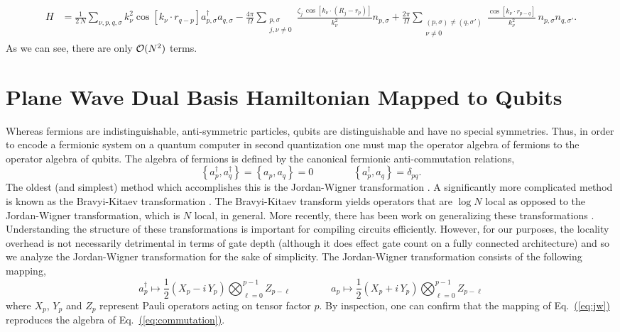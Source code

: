 \documentclass[superscriptaddress,aps,pra,nofootinbib,notitlepage,10pt,longbibliography]{revtex4-1}
\newcommand{\eq}[1]{Eq.~\hyperref[eq:#1]{(\ref*{eq:#1})}}
\begin{document}
\begin{align}
\label{eq:pwd_ham}
H & = \frac{1}{2\, N} \!\!\!\sum_{\nu, p, q, \sigma} \!\! k_\nu^2 \cos \left[k_\nu \cdot r_{q - p} \right] a^\dagger_{p, \sigma} a_{q,\sigma}
%
- \frac{4 \pi}{\Omega} \sum_{\substack{p,\sigma \\ j, \nu\neq 0}} \frac{\zeta_j \, \cos\left[ k_{\nu} \cdot \left(R_j - r_{p}\right)\right]}{k_\nu^2} n_{p, \sigma} +
%
\frac{2 \pi}{\Omega } \!\!\!\!\! \sum_{\substack{(p, \sigma) \neq (q, \sigma') \\ \nu \neq 0}}\!\!\!\!\!\!\!\! \frac{\cos \left[k_\nu \cdot r_{p-q}\right]}{k_\nu^2} \, n_{p, \sigma} n_{q, \sigma'}.
\end{align}
As we can see, there are only ${\cal O}(N^2)$ terms.



\section{Plane Wave Dual Basis Hamiltonian Mapped to Qubits}
\label{app:qubit_ham}

Whereas fermions are indistinguishable, anti-symmetric particles, qubits are distinguishable and have no special symmetries. Thus, in order to encode a fermionic system on a quantum computer in second quantization one must map the operator algebra of fermions to the operator algebra of qubits. The algebra of fermions is defined by the canonical fermionic anti-commutation relations,
\begin{equation}
\left\{ a^\dagger_p, a^\dagger_q \right\} = \left\{ a_p, a_q \right\} = 0 \quad \quad \quad \quad \left\{ a^\dagger_p, a_q \right\} = \delta_{pq}.
\label{eq:commutation}
\end{equation}
The oldest (and simplest) method which accomplishes this is the Jordan-Wigner transformation \cite{Jordan1928}. A significantly more complicated method is known as the Bravyi-Kitaev transformation \cite{Bravyi2002,Seeley2012,Tranter2015}. The Bravyi-Kitaev transform yields operators that are $\log N$ local as opposed to the Jordan-Wigner transformation, which is $N$ local, in general. More recently, there has been work on generalizing these transformations \cite{Whitfield2016,Havlicek2017,Bravyi2017}. Understanding the structure of these transformations is important for compiling circuits efficiently. However, for our purposes, the locality overhead is not necessarily detrimental in terms of gate depth (although it does effect gate count on a fully connected architecture) and so we analyze the Jordan-Wigner transformation for the sake of simplicity. The Jordan-Wigner transformation consists of the following mapping,
\begin{equation}
a^\dagger_p \mapsto \frac{1}{2} \left(X_p - i \, Y_p\right) \bigotimes_{\ell = 0}^{p - 1} Z_{p - \ell}
%
\quad \quad \quad \quad
%
a_p \mapsto \frac{1}{2} \left(X_p + i \, Y_p\right) \bigotimes_{\ell = 0}^{p - 1} Z_{p - \ell}
\label{eq:jw}
\end{equation}
where $X_p$, $Y_p$ and $Z_p$ represent Pauli operators acting on tensor factor $p$. By inspection, one can confirm that the mapping of \eq{jw} reproduces the algebra of \eq{commutation}.
\end{document}
